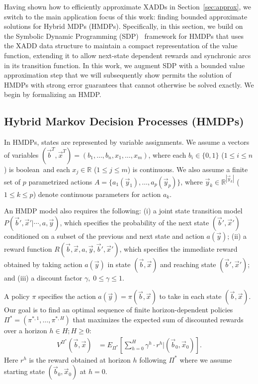 \label{sec:basdp}

Having shown how to efficiently approximate XADDs in
Section~\ref{sec:approx}, we switch to the main application focus of
this work: finding bounded approximate solutions for Hybrid MDPs
(HMDPs).  Specifically, in this section, we build on the Symbolic
Dynamic Programming (SDP)~\cite{sanner_uai11,zamani12} framework for
HMDPs that uses the XADD data structure to maintain a compact
representation of the value function, extending it to allow next-state
dependent rewards and synchronic arcs in its transition function.  In
this work, we augment SDP with a bounded value approximation step that
we will subsequently show permits the solution of HMDPs with strong
error guarantees that cannot otherwise be solved exactly.  We begin by
formalizing an HMDP.

\subsection{Hybrid Markov Decision Processes (HMDPs) }

In HMDPs, states are represented by variable assignments. We assume a
vectors of variables $(\vec{b}^T,\vec{x}^T) = (
b_1,\ldots,b_n,x_{1},\ldots,x_m )$, where each $b_i \in \{ 0,1 \}$
($1 \leq i \leq n$) is boolean$\,$ and each $x_j \in \mathbb{R}$
($1 \leq j \leq m$) is continuous. We also assume a finite set of $p$
parametrized actions $A = \{ a_1(\vec{y}_1), \ldots,
a_p(\vec{y}_p) \}$, where $\vec{y}_k \in \mathbb{R}^{|\vec{y}_k|}$
($1 \leq k \leq p$) denote continuous parameters for action $a_k$.

An HMDP model also requires the following: (i) a joint state transition
model $P(\vec{b}',\vec{x}'|\cdots,a,\vec{y})$, which specifies the
probability of the next state $(\vec{b}',\vec{x}')$ conditioned on a
subset of the previous and next state and action $a(\vec{y})$; (ii) a
reward function $R(\vec{b},\vec{x},a,\vec{y},\vec{b}',\vec{x}')$,
which specifies the immediate reward obtained by taking action
$a(\vec{y})$ in state $(\vec{b},\vec{x})$ and reaching state
$(\vec{b}',\vec{x}')$; and (iii) a discount factor $\gamma, \;
0 \leq \gamma \leq 1$.

A policy $\pi$ specifies the action $a(\vec{y}) =
\pi(\vec{b},\vec{x})$ to take in each state $(\vec{b},\vec{x})$.  Our
goal is to find an optimal sequence of finite horizon-dependent
policies $\Pi^* = (\pi^{*,1},\ldots,\pi^{*,H})$ that
maximizes the expected sum of discounted rewards over a horizon $h \in
H; H \geq 0$:
\begin{align}
V^{\Pi^*}(\vec{b},\vec{x}) & = E_{\Pi^*} \left[ \sum_{h=0}^{H} \gamma^h \cdot r^h \Big| (\vec{b}_0,\vec{x}_0) \right]. \label{eq:vfun_def}
\end{align}
Here $r^h$ is the reward obtained at horizon $h$ following $\Pi^*$
where we assume starting state $(\vec{b}_0,\vec{x}_0)$ at $h=0$.
 
